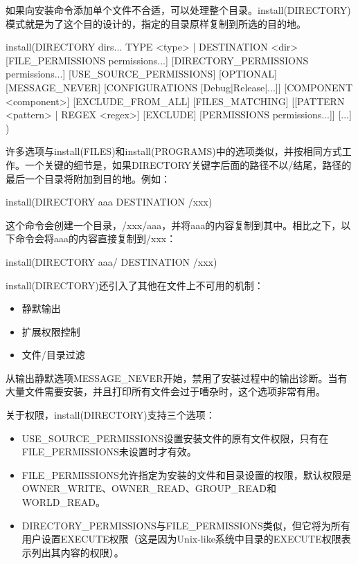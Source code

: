 
如果向安装命令添加单个文件不合适，可以处理整个目录。install(DIRECTORY)模式就是为了这个目的设计的，指定的目录原样复制到所选的目的地。

\begin{shell}
install(DIRECTORY dirs...
        TYPE <type> | DESTINATION <dir>
        [FILE_PERMISSIONS permissions...]
        [DIRECTORY_PERMISSIONS permissions...]
        [USE_SOURCE_PERMISSIONS] [OPTIONAL] [MESSAGE_NEVER]
        [CONFIGURATIONS [Debug|Release|...]]
        [COMPONENT <component>] [EXCLUDE_FROM_ALL]
        [FILES_MATCHING]
        [[PATTERN <pattern> | REGEX <regex>] [EXCLUDE]
        [PERMISSIONS permissions...]] [...]
)
\end{shell}

许多选项与install(FILES)和install(PROGRAMS)中的选项类似，并按相同方式工作。一个关键的细节是，如果DIRECTORY关键字后面的路径不以/结尾，路径的最后一个目录将附加到目的地。例如：

\begin{cmake}
install(DIRECTORY aaa DESTINATION /xxx)
\end{cmake}

这个命令会创建一个目录，/xxx/aaa，并将aaa的内容复制到其中。相比之下，以下命令会将aaa的内容直接复制到/xxx：

\begin{cmake}
install(DIRECTORY aaa/ DESTINATION /xxx)
\end{cmake}

install(DIRECTORY)还引入了其他在文件上不可用的机制：

\begin{itemize}
\item
静默输出

\item
扩展权限控制

\item
文件/目录过滤
\end{itemize}

从输出静默选项MESSAGE\_NEVER开始，禁用了安装过程中的输出诊断。当有大量文件需要安装，并且打印所有文件会过于嘈杂时，这个选项非常有用。

关于权限，install(DIRECTORY)支持三个选项：

\begin{itemize}
\item
USE\_SOURCE\_PERMISSIONS设置安装文件的原有文件权限，只有在FILE\_PERMISSIONS未设置时才有效。

\item
FILE\_PERMISSIONS允许指定为安装的文件和目录设置的权限，默认权限是OWNER\_WRITE、OWNER\_READ、GROUP\_READ和WORLD\_READ。

\item
DIRECTORY\_PERMISSIONS与FILE\_PERMISSIONS类似，但它将为所有用户设置EXECUTE权限（这是因为Unix-like系统中目录的EXECUTE权限表示列出其内容的权限）。
\end{itemize}

